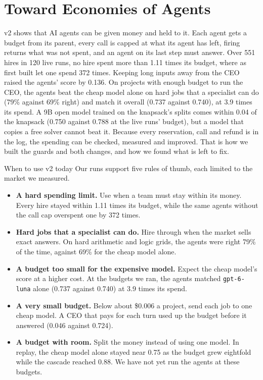 \section{Toward Economies of Agents}
\label{sec:conclusion}

\sys{} v2 shows that AI agents can be given money and held to it. Each agent gets a budget from its parent, every call
is capped at what its agent has left, firing returns what was not spent, and an agent on its last step must answer.
Over 551 hires in 120 live runs, no hire spent more than 1.11 times its budget, where \sys{} as first built let one
spend 372 times. Keeping long inputs away from the CEO raised the agents' score by 0.136. On projects with enough budget
to run the CEO, the agents beat the cheap model alone on hard jobs that a specialist can do (79\% against 69\% right)
and match it overall (0.737 against 0.740), at 3.9 times its spend. A 9B open model trained on the knapsack's splits
comes within 0.04 of the knapsack (0.750 against 0.788 at the live runs' budget), but a model that copies a free solver
cannot beat it. Because every reservation, call and refund is in the log, the spending can be checked, measured and improved. That is how we built the guards and both changes, and how
we found what is left to fix.

\begin{keybox}{When to use \sys{} v2 today}
Our runs support five rules of thumb, each limited to the market we measured.
\begin{itemize}
  \item \textbf{A hard spending limit.} Use \sys{} when a team must stay within its money. Every hire stayed within
  1.11 times its budget, while the same agents without the call cap overspent one by 372 times.
  \item \textbf{Hard jobs that a specialist can do.} Hire through \sys{} when the market sells exact answers. On hard
  arithmetic and logic grids, the agents were right 79\% of the time, against 69\% for the cheap model alone.
  \item \textbf{A budget too small for the expensive model.} Expect the cheap model's score at a higher cost. At the
  budgets we ran, the agents matched \texttt{gpt-6-luna} alone (0.737 against 0.740) at 3.9 times its spend.
  \item \textbf{A very small budget.} Below about \$0.006 a project, send each job to one cheap model. A CEO that pays
  for each turn used up the budget before it answered (0.046 against 0.724).
  \item \textbf{A budget with room.} Split the money instead of using one model. In replay, the cheap model alone
  stayed near 0.75 as the budget grew eightfold while the cascade reached 0.88. We have not yet run the agents at these
  budgets.
\end{itemize}
\end{keybox}

